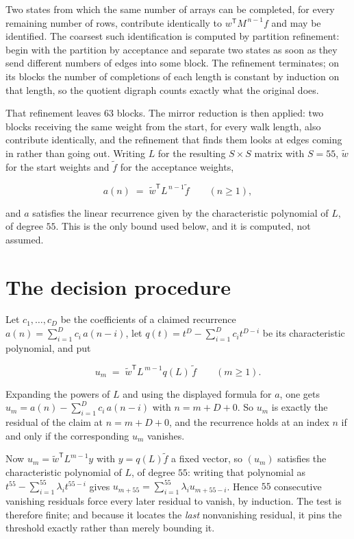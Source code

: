 \documentclass[11pt]{article}
\theoremstyle{definition}
\begin{document}
Two states from which the same number of arrays can be completed, for every remaining number of rows, contribute identically to $w^{\mathsf T}M^{\,n-1}f$ and may be identified. The coarsest such identification is computed by partition refinement: begin with the partition by acceptance and separate two states as soon as they send different numbers of edges into some block. The refinement terminates; on its blocks the number of completions of each length is constant by induction on that length, so the quotient digraph counts exactly what the original does.

That refinement leaves $63$ blocks. The mirror reduction is then applied: two blocks receiving the same weight from the start, for every walk length, also contribute identically, and the refinement that finds them looks at edges coming in rather than going out. Writing $L$ for the resulting $S \times S$ matrix with $S = 55$, $\tilde w$ for the start weights and $\tilde f$ for the acceptance weights,

\[a(n) \;=\; \tilde w^{\mathsf T} L^{\,n-1} \tilde f \qquad (n \ge 1),\]

and $a$ satisfies the linear recurrence given by the characteristic polynomial of $L$, of degree $55$. This is the only bound used below, and it is computed, not assumed.

\section{The decision procedure}

Let $c_1,\dots,c_D$ be the coefficients of a claimed recurrence $a(n) = \sum_{i=1}^{D} c_i\,a(n-i)$, let $q(t) = t^{D} - \sum_{i=1}^{D} c_i t^{D-i}$ be its characteristic polynomial, and put

\[u_m \;=\; \tilde w^{\mathsf T} L^{\,m-1} q(L)\,\tilde f \qquad (m \ge 1).\]

Expanding the powers of $L$ and using the displayed formula for $a$, one gets $u_m = a(n) - \sum_{i=1}^{D} c_i\,a(n-i)$ with $n = m + D + 0$. So $u_m$ is exactly the residual of the claim at $n = m + D + 0$, and the recurrence holds at an index $n$ if and only if the corresponding $u_m$ vanishes.

Now $u_m = \tilde w^{\mathsf T} L^{m-1} y$ with $y = q(L)\tilde f$ a fixed vector, so $(u_m)$ satisfies the characteristic polynomial of $L$, of degree $55$: writing that polynomial as $t^{55} - \sum_{i=1}^{55} \lambda_i t^{55-i}$ gives $u_{m+55} = \sum_{i=1}^{55} \lambda_i u_{m+55-i}$. Hence $55$ consecutive vanishing residuals force every later residual to vanish, by induction. The test is therefore finite; and because it locates the {\itshape last} nonvanishing residual, it pins the threshold exactly rather than merely bounding it.
\end{document}

